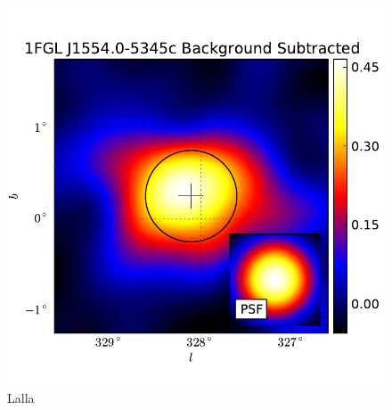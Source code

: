 \documentclass{emulateapj}
\begin{document}
  \begin{figure}
    \begin{center}
      \includegraphics[type=pdf,ext=.pdf,read=.pdf]{source_plots/source_1FGL_J1554.0-5345c}
    \end{center}
    \caption{Lalla}
  \end{figure}
\end{document}
